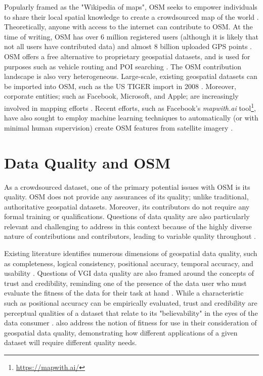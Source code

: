 Popularly framed as the "Wikipedia of maps", OSM seeks to empower individuals to share their local spatial knowledge to create a crowdsourced map of the world \parencite{fox_openstreetmap_2012, lu_after_2019}. Theoretically, anyone with access to the internet can contribute to OSM. At the time of writing, OSM has over 6 million registered users (although it is likely that not all users have contributed data) and almost 8 billion uploaded GPS points \parencite{noauthor_openstreetmap_2020}. OSM offers a free alternative to proprietary geospatial datasets, and is used for purposes such as vehicle routing \parencite{graser_is_2015, luxen_real-time_2011} and POI searching \parencite{ruta_indooroutdoor_2015}. The OSM contribution landscape is also very heterogeneous. Large-scale, existing geospatial datasets can be imported into OSM, such as the US TIGER import in 2008 \parencite{zielstra_assessing_2013}. Moreover, corporate entities; such as Facebook, Microsoft, and Apple; are increasingly involved in mapping efforts \parencite{anderson_corporate_2019}. Recent efforts, such as Facebook's \textit{mapwith.ai} tool\footnote{\url{https://mapwith.ai/}}, have also sought to employ machine learning techniques to automatically (or with minimal human supervision) create OSM features from satellite imagery \parencite{albrecht_change_2020, yadav_human_2020}. 

\section{Data Quality and OSM}

As a crowdsourced dataset, one of the primary potential issues with OSM is its quality. OSM does not provide any assurances of its quality; unlike traditional, authoritative geospatial datasets. Moreover, its contributors do not require any formal training or qualifications. Questions of data quality are also particularly relevant and challenging to address in this context because of the highly diverse nature of contributions and contributors, leading to variable quality throughout  \parencite{girres_quality_2010, grochenig_digging_2014, haklay_how_2010, neis_analyzing_2012}. 

Existing literature identifies numerous dimensions of geospatial data quality, such as completeness, logical consistency, positional accuracy, temporal accuracy, and usability \parencite{antoniou_measures_2015, fox_notion_1994, van_oort_spatial_2006}. Questions of VGI data quality are also framed around the concepts of trust and credibility, reminding one of the presence of the data user who must evaluate the fitness of the data for their task at hand \parencite{flanagin_credibility_2008, severinsen_vgtrust_2019}. While a characteristic such as positional accuracy can be empirically evaluated, trust and credibility are perceptual qualities of a dataset that relate to its "believability" in the eyes of the data consumer \parencite{flanagin_credibility_2008}. \textcite{barron_comprehensive_2014} also address the notion of fitness for use in their consideration of geospatial data quality, demonstrating how different applications of a given dataset will require different quality needs. 

